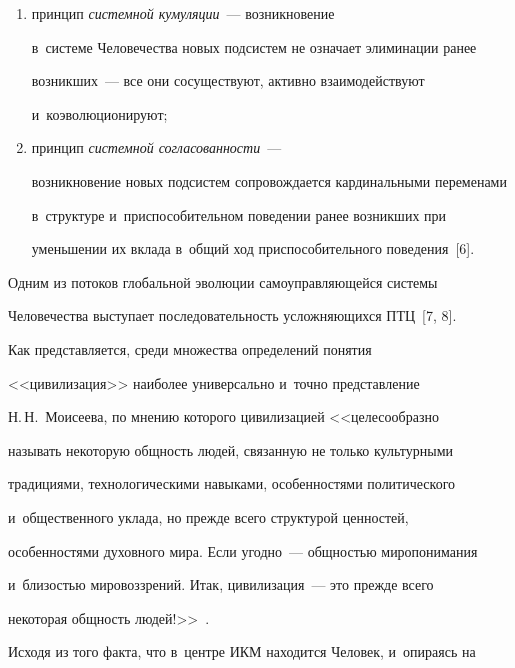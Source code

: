 \begin{enumerate}[(1)]


\item принцип \textit{сис\-тем\-ной кумуляции}~--- возникновение 


в~системе Человечества новых под\-сис\-тем не означает элиминации ранее 


возникших~--- все они сосуществуют, активно взаимодействуют 


и~коэволюционируют; 


\item принцип \textit{сис\-тем\-ной согласованности}~--- 


возникновение новых под\-сис\-тем сопровождается кардинальными переменами 


в~структуре и~приспособительном поведении ранее возникших при 


уменьшении их вклада в~общий ход приспособительного поведения~[6]. 


\end{enumerate}


  


  Одним из потоков глобальной эволюции самоуправляющейся сис\-те\-мы 


Человечества выступает последовательность усложняющихся ПТЦ~[7, 8]. 


  


  Как представляется, среди множества определений понятия 


<<цивилизация>> наиболее универсально и~точно представление 


Н.\,Н.~Моисеева, по мнению которого цивилизацией <<целесообразно 


называть некоторую общность людей, связанную не только культурными 


традициями, технологическими навыками, особенностями политического 


и~общественного уклада, но прежде всего структурой ценностей, 


особенностями духовного мира. Если угодно~--- общ\-ностью миропонимания 


и~бли\-зостью мировоззрений. Итак, цивилизация~--- это прежде всего 


некоторая общность людей!>>~\cite[с.~88]{9-gri}. 


  


  Исходя из того факта, что в~центре ИКМ находится Человек, и~опираясь на 


